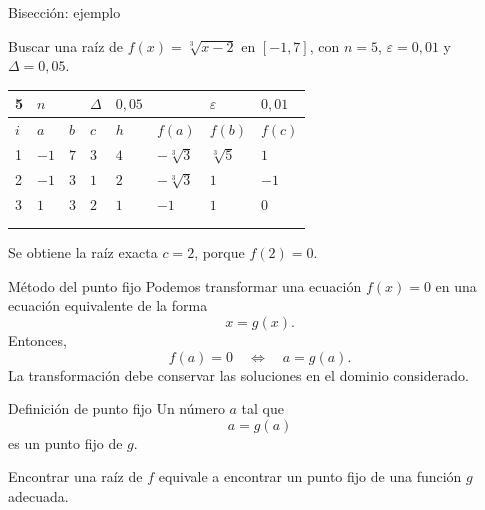 \documentclass[main.tex]{subfiles}
\begin{document}
\begin{frame}[t]{Bisección: ejemplo}
\begin{minipage}[t][13mm][t]{\textwidth}\small Buscar una raíz de $f(x)=\sqrt[3]{x-2}$ en $[-1,7]$, con $n=5$, $\varepsilon=0{,}01$ y $\Delta=0{,}05$.\end{minipage}\par{\scriptsize\setlength{\tabcolsep}{2pt}\renewcommand{\arraystretch}{1}\begin{center}\begin{tabular}{|C{.04\textwidth}|C{.112\textwidth}|C{.112\textwidth}|C{.112\textwidth}|C{.112\textwidth}|C{.112\textwidth}|C{.112\textwidth}|C{.112\textwidth}|}
\hline
\rule{0pt}{4.3mm}5 & $n$ &  &  $\Delta$  & $0{,}05$ &  & $\varepsilon$ & $0{,}01$\\\hline
\rule{0pt}{4.3mm}$i$ & $a$ & $b$ & $c$ & $h$ & $f(a)$ & $f(b)$ & $f(c)$\\\hline
\rule{0pt}{4.3mm}1 & $-1$ & $7$ & $3$ & $4$ & $-\sqrt[3]3$ & $\sqrt[3]5$ & $1$\\\hline
\rule{0pt}{4.3mm}2 & $-1$ & $3$ & $1$ & $2$ & $-\sqrt[3]3$ & $1$ & $-1$\\\hline
\rule{0pt}{4.3mm}3 & $1$ & $3$ & $2$ & $1$ & $-1$ & $1$ & $0$\\\hline
\rule{0pt}{4.3mm} &  &  &  &  &  &  & \\\hline
\rule{0pt}{4.3mm} &  &  &  &  &  &  & \\\hline
\end{tabular}\end{center}}\begin{minipage}[t][10mm][t]{\textwidth}\footnotesize Se obtiene la raíz exacta $c=2$, porque $f(2)=0$.\end{minipage}
\end{frame}

\begin{frame}{Método del punto fijo}
Podemos transformar una ecuación $f(x)=0$ en una ecuación equivalente de la forma\[x=g(x).\]Entonces,\[f(a)=0\quad\Longleftrightarrow\quad a=g(a).\]La transformación debe conservar las soluciones en el dominio considerado.
\end{frame}

\begin{frame}{Definición de punto fijo}
Un número $a$ tal que\[a=g(a)\]es un \alert{punto fijo} de $g$.\par\medskip Encontrar una raíz de $f$ equivale a encontrar un punto fijo de una función $g$ adecuada.
\end{frame}
\end{document}
